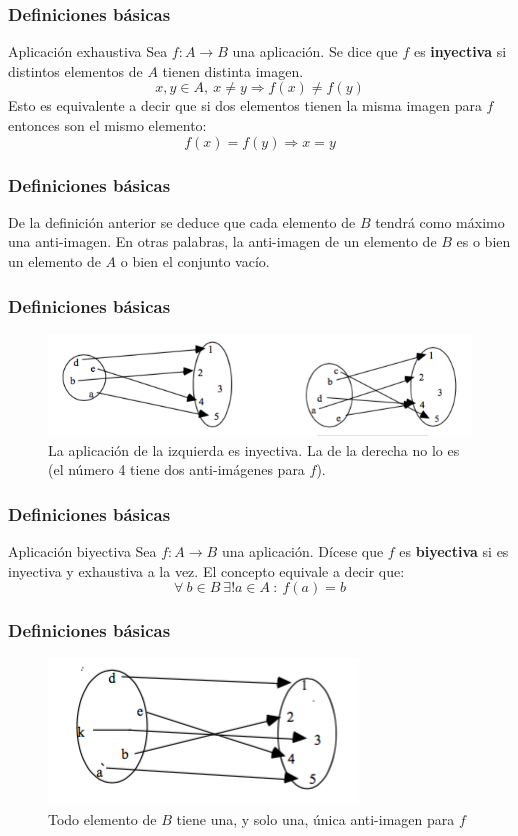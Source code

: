 \documentclass{beamer}
\begin{document}
\begin{frame}
  \frametitle{Definiciones b\'asicas}
  \begin{block}{Aplicaci\'on exhaustiva}
Sea $f:A\longrightarrow B$ una aplicaci\'on. Se dice que $f$ es \textbf{inyectiva} si distintos elementos de $A$ tienen distinta imagen.
\[x,y\in A, \ x\neq y \Rightarrow  f(x) \neq f(y)\]
Esto es equivalente a decir que si dos elementos tienen la misma imagen para $f$ entonces son el mismo elemento:
\[f(x) = f(y) \Rightarrow x = y\]
\end{block}
\end{frame}



\begin{frame}
  \frametitle{Definiciones b\'asicas}
De la definici\'on anterior se deduce que cada elemento de $B$ tendr\'a como m\'aximo una anti-imagen. En otras palabras, la anti-imagen de un elemento de $B$ es o bien un elemento de $A$ o bien el conjunto vac\'io.
\end{frame}

\begin{frame}
  \frametitle{Definiciones b\'asicas}
\begin{figure}[h]
  \label{fig:esquema}
  \caption{La aplicaci\'on de la izquierda es inyectiva. La de la derecha no lo es (el n\'umero 4 tiene dos anti-im\'agenes para $f$).}
\centering
\includegraphics[width=\textwidth]{injectiva}
\end{figure}
\end{frame}



\begin{frame}
  \frametitle{Definiciones b\'asicas}
  \begin{block}{Aplicaci\'on biyectiva}
Sea $f:A\longrightarrow B$ una aplicaci\'on. D\'icese que $f$ es \textbf{biyectiva} si es inyectiva y exhaustiva a la vez. El concepto equivale a decir que:
\[\forall\ b\in B\ \exists ! a\in A\ : \ f(a) = b\]
\end{block}
\end{frame}

\begin{frame}
  \frametitle{Definiciones b\'asicas}
\begin{figure}[h]
  \label{fig:esquema}
  \caption{Todo elemento de $B$ tiene una, y solo una, \'unica anti-imagen para $f$}
\centering
\includegraphics[scale=0.7]{bijectiva}
\end{figure}
\end{frame}
\end{document}
